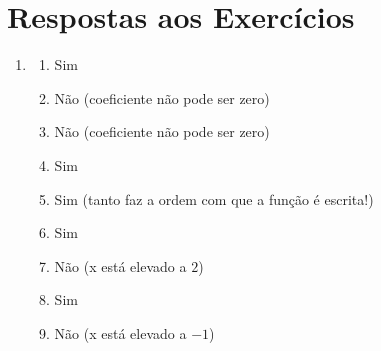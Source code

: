 \documentclass[11pt]{article}
\begin{document}
\section{Respostas aos Exercícios}
\begin{enumerate}
	\item
		\begin{enumerate}
			\item Sim
			\item Não (coeficiente não pode ser zero)
			\item Não (coeficiente não pode ser zero)
			\item Sim
			\item Sim (tanto faz a ordem com que a função é escrita!)
			\item Sim
			\item Não (x está elevado a $2$)
			\item Sim
			\item Não (x está elevado a $-1$)
		\end{enumerate}


\end{enumerate}
\end{document}
